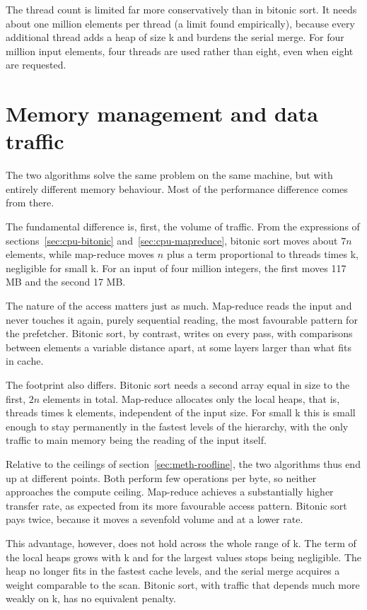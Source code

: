 The thread count is limited far more conservatively than in bitonic sort. It
needs about one million elements per thread (a limit found empirically),
because every additional thread adds a heap of size k and burdens the serial
merge. For four million input elements, four threads are used rather than
eight, even when eight are requested.

\section{Memory management and data traffic}
\label{sec:cpu-memory}

The two algorithms solve the same problem on the same machine, but with
entirely different memory behaviour. Most of the performance difference comes
from there.

The fundamental difference is, first, the volume of traffic. From the
expressions of sections~\ref{sec:cpu-bitonic} and~\ref{sec:cpu-mapreduce},
bitonic sort moves about $7n$ elements, while map-reduce moves $n$ plus a term
proportional to threads times k, negligible for small k. For an input of four
million integers, the first moves 117 MB and the second 17 MB.

The nature of the access matters just as much. Map-reduce reads the input and
never touches it again, purely sequential reading, the most favourable pattern
for the prefetcher. Bitonic sort, by contrast, writes on every pass, with
comparisons between elements a variable distance apart, at some layers larger
than what fits in cache.

The footprint also differs. Bitonic sort needs a second array equal in size to
the first, $2n$ elements in total. Map-reduce allocates only the local heaps,
that is, threads times k elements, independent of the input size. For small k
this is small enough to stay permanently in the fastest levels of the
hierarchy, with the only traffic to main memory being the reading of the input
itself.

Relative to the ceilings of section~\ref{sec:meth-roofline}, the two algorithms
thus end up at different points. Both perform few operations per byte, so
neither approaches the compute ceiling. Map-reduce achieves a substantially
higher transfer rate, as expected from its more favourable access pattern.
Bitonic sort pays twice, because it moves a sevenfold volume and at a lower
rate.

This advantage, however, does not hold across the whole range of k. The term of
the local heaps grows with k and for the largest values stops being negligible.
The heap no longer fits in the fastest cache levels, and the serial merge
acquires a weight comparable to the scan. Bitonic sort, with traffic that
depends much more weakly on k, has no equivalent penalty.

